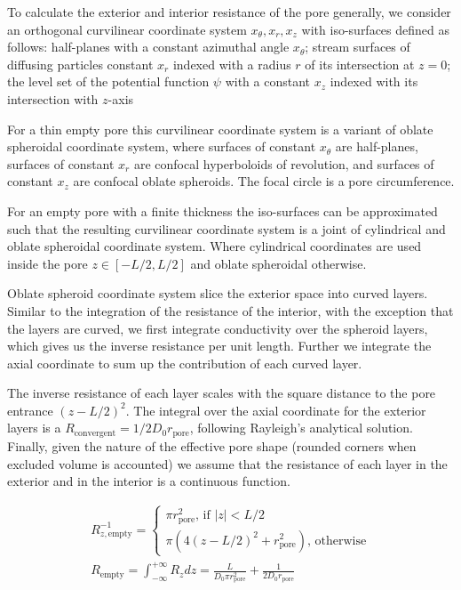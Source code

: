 \documentclass[12pt, a4paper]{article}
\begin{document}
To calculate the exterior and interior resistance of the pore generally, we consider an orthogonal curvilinear coordinate system $x_{\theta}, x_{r}, x_{z}$ with iso-surfaces defined as follows:
    half-planes with a constant azimuthal angle $x_{\theta}$;
    stream surfaces of diffusing particles constant $x_{r}$ indexed with a radius $r$ of its intersection at $z=0$;
    the level set of the potential function $\psi$ with a constant $x_{z}$ indexed with its intersection with $z$-axis

For a thin empty pore this curvilinear coordinate system is a variant of oblate spheroidal coordinate system, where surfaces of constant $x_{\theta}$ are half-planes, surfaces of constant $x_{r}$ are confocal hyperboloids of revolution, and surfaces of constant $x_{z}$ are confocal oblate spheroids. The focal circle is a pore circumference.

For an empty pore with a finite thickness the iso-surfaces can be approximated such that the resulting curvilinear coordinate system is a joint of cylindrical and oblate spheroidal coordinate system.
Where cylindrical coordinates are used inside the pore $z \in [-L/2, L/2]$ and oblate spheroidal otherwise.

Oblate spheroid coordinate system slice the exterior space into curved layers.
Similar to the integration of the resistance of the interior, with the exception that the layers are curved, we first integrate conductivity over the spheroid layers, which gives us the inverse resistance per unit length.
Further we integrate the axial coordinate to sum up the contribution of each curved layer.

The inverse resistance of each layer scales with the square distance to the pore entrance $(z-L/2)^2$.
The integral over the axial coordinate for the exterior layers is a $R_{\textrm{convergent}} = 1/2 D_0 r_{\textrm{pore}}$, following Rayleigh's analytical solution.
Finally, given the nature of the effective pore shape (rounded corners when excluded volume is accounted) we assume that the resistance of each layer in the exterior and in the interior is a continuous function.

\begin{eqnarray}
    R_{z, \textrm{empty}}^{-1} = 
    \begin{cases}
        \pi r_{\textrm{pore}}^2 \textrm{, if } |z| < L/2
        \\
        \pi (4(z-L/2)^2 + r_{\textrm{pore}}^2) \textrm{, otherwise} 
    \end{cases}
    \\
    R_{\textrm{empty}} = \int_{-\infty}^{+\infty }R_z dz = \frac{L}{D_0\pi r_{\text{pore}}^{2}}+\frac{1}{2D_0r_{\text{pore}}}
\end{eqnarray}
\end{document}
